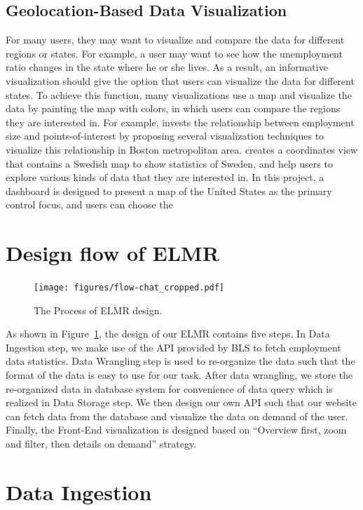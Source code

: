 \documentclass{sigchi}
\begin{document}
\subsection{Geolocation-Based Data Visualization}
For many users, they may want to visualize and compare the data for different regions or states. For example, a user may want to see how the unemployment ratio changes in the state where he or she lives. As a result, an informative visualization should give the option that users can visualize the data for different states. To achieve this function, many visualizations use a map and visualize the data by painting the map with colors, in which users can compare the regions they are interested in. For example, \cite{Rodrigues2013} invests the relationship between employment size and points-of-interest by proposing several visualization techniques to visualize this relationship in Boston metropolitan area. \cite{Feldt2005} creates a coordinates view that contains a Swedish map to show statistics of Sweden, and help users to explore various kinds of data that they are interested in. In this project, a dashboard is designed to present a map of the United States as the primary control focus, and users can choose the

\section{Design flow of ELMR}
\begin{figure}[!htbp]
\centering
\texttt{[image: figures/flow-chat\_cropped.pdf]}
\caption{The Process of ELMR design.}
\label{fig:flow}
\end{figure}
As shown in Figure~\ref{fig:flow}, the design of our ELMR contains five steps. In Data Ingestion step, we make use of the API provided by BLS to fetch employment data statistics. Data Wrangling step is used to re-organize the data such that the format of the data is easy to use for our task. After data wrangling, we store the re-organized data in database system for convenience of data query which is realized in Data Storage step. We then design our own API such that our website can fetch data from the database and visualize the data on demand of the user. Finally, the Front-End visualization is designed based on ``Overview first, zoom and filter, then details on demand''\cite{overview} strategy.

\section{Data Ingestion}
\end{document}
